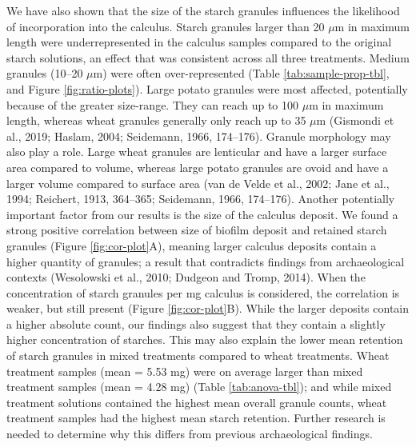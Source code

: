 \documentclass[utf8]{../templates/frontiersSCNS}
\begin{document}
We have also shown that the size of the starch granules influences the likelihood
of incorporation into the calculus. Starch granules larger than 20 \(\mu\)m in
maximum length were underrepresented in the calculus samples compared to the original
starch solutions, an effect that was consistent across all three treatments. Medium
granules (10--20 \(\mu\)m) were often over-represented
(Table \ref{tab:sample-prop-tbl},
and
Figure \ref{fig:ratio-plots}).
Large potato granules were most affected, potentially because of the greater
size-range. They can reach up to 100 \(\mu\)m in maximum length, whereas wheat
granules generally only reach up to 35 \(\mu\)m
(Gismondi et al., 2019; Haslam, 2004; Seidemann, 1966, 174--176).
Granule morphology may also play a role. Large wheat granules
are lenticular and have a larger surface area compared
to volume, whereas large potato granules are ovoid and have a larger volume
compared to surface area
(van de Velde et al., 2002; Jane et al., 1994; Reichert, 1913, 364--365; Seidemann, 1966, 174--176).
Another potentially important factor
from our results is the size of the calculus deposit. We found a
strong positive correlation between size of biofilm deposit and
retained starch granules (Figure \ref{fig:cor-plot}A), meaning larger calculus
deposits contain a higher quantity of granules;
a result that contradicts findings from archaeological contexts
(Wesolowski et al., 2010; Dudgeon and Tromp, 2014).
When the concentration of starch granules
per mg calculus is considered, the correlation is weaker, but still present
(Figure \ref{fig:cor-plot}B).
While the larger deposits contain a higher absolute count, our findings also suggest
that they contain a slightly higher concentration of starches. This may also explain
the lower mean retention of starch granules in mixed treatments compared to
wheat treatments. Wheat treatment samples (mean = 5.53 mg) were on average larger than mixed treatment samples (mean = 4.28 mg) (Table \ref{tab:anova-tbl}); and while mixed treatment solutions contained the highest mean overall
granule counts, wheat treatment samples had the highest mean starch retention.
Further research is needed to determine why this differs from previous archaeological
findings.
\end{document}
